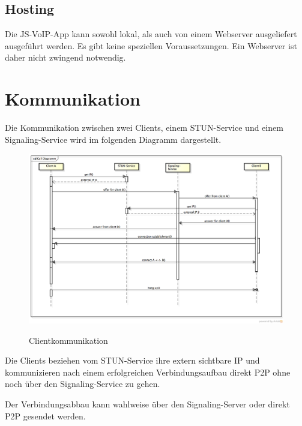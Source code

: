 	\subsection{Hosting}
		Die JS-VoIP-App kann sowohl lokal, als auch von einem
		Webserver ausgeliefert ausgeführt werden. Es gibt keine speziellen Voraussetzungen. Ein Webserver ist daher nicht zwingend notwendig.
		

\clearpage
\section{Kommunikation}
	Die Kommunikation zwischen zwei Clients, einem STUN-Service und einem
	Signaling-Service wird im folgenden Diagramm dargestellt.
	\begin{figure}[H]
		\centering
		\includegraphics[width=\textwidth]{../architekturanalayse/img/callDiagramm.png}
		\label{img:deployment}
		\caption{Clientkommunikation}
	\end{figure}
	Die Clients beziehen vom STUN-Service ihre extern sichtbare IP und
	kommunizieren nach einem erfolgreichen Verbindungsaufbau direkt P2P ohne noch
	über den Signaling-Service zu gehen.
	
	Der Verbindungsabbau kann wahlweise über den Signaling-Server oder direkt P2P
	gesendet werden.
	
